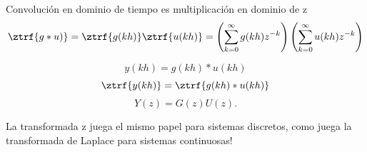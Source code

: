 \documentclass[presentation,aspectratio=169]{beamer}
\begin{document}
\begin{frame}[label={sec:orgd467606}]{Convolución en dominio de tiempo es multiplicación en dominio de z}
\[ \ztrf{g \ast u)} = \ztrf{g(kh)} \ztrf{u(kh)} = \left(\sum_{k=0}^{\infty} g(kh)z^{-k}\right) \left(\sum_{k=0}^{\infty} u(kh)z^{-k}\right)\]


\begin{center}
\end{center}
\[ y(kh) = g(kh) \ast u(kh) \]
\[ \ztrf{y(kh)} = \ztrf{g(kh) \ast u(kh)} \]
\[ Y(z) = G(z) U(z). \]

\begin{tcolorbox}
La transformada z juega el mismo papel para sistemas discretos, como juega la transformada de Laplace para sistemas continuosas!
\end{tcolorbox}
\end{frame}
\end{document}
